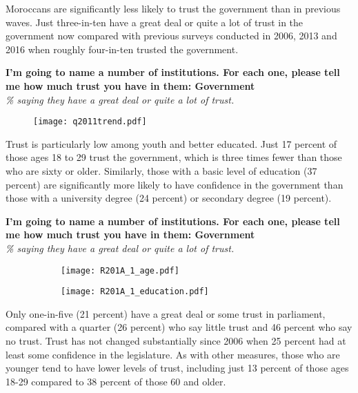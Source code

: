 \documentclass[12pt]{article}
\begin{document}
	\noindent Moroccans are significantly less likely to trust the government than in previous waves. Just three-in-ten have a great deal or quite a lot of trust in the government now compared with previous surveys conducted in 2006, 2013 and 2016 when roughly four-in-ten trusted the government.
	
	\begin{center}
		{\textbf{I'm going to name a number of institutions. For each one, please tell me how much trust you have in them: Government}}\\
		\emph{\% saying they have a great deal or quite a lot of trust.}
		\begin{figure}[H]
			\centering
			\texttt{[image: q2011trend.pdf]}
		\end{figure}
	\end{center}
	
	\noindent Trust is particularly low among youth and better educated. Just 17 percent of those ages 18 to 29 trust the government, which is three times fewer than those who are sixty or older. Similarly, those with a basic level of education (37 percent) are significantly more likely to have confidence in the government than those with a university degree (24 percent) or secondary degree (19 percent).
	
		\pagebreak
	\begin{center}
		{\textbf{I'm going to name a number of institutions. For each one, please tell me how much trust you have in them: Government}}\\
		\emph{\% saying they have a great deal or quite a lot of trust.}
	\end{center}
	\begin{figure}[H]
		\hspace{-1cm}\begin{minipage}{0.5\linewidth}
			\begin{figure}[H]
				\centering
				\texttt{[image: R201A\_1\_age.pdf]} 
			\end{figure}
		\end{minipage}
		\begin{minipage}{0.4\linewidth}
			\begin{figure}[H]
				\texttt{[image: R201A\_1\_education.pdf]}
			\end{figure}
		\end{minipage}
	\end{figure}

	\noindent Only one-in-five (21 percent) have a great deal or some trust in parliament, compared with a quarter (26 percent) who say little trust and 46 percent who say no trust. Trust has not changed substantially since 2006 when 25 percent had at least some confidence in the legislature. As with other measures, those who are younger tend to have lower levels of trust, including just 13 percent of those ages 18-29 compared to 38 percent of those 60 and older.
	
\end{document}
